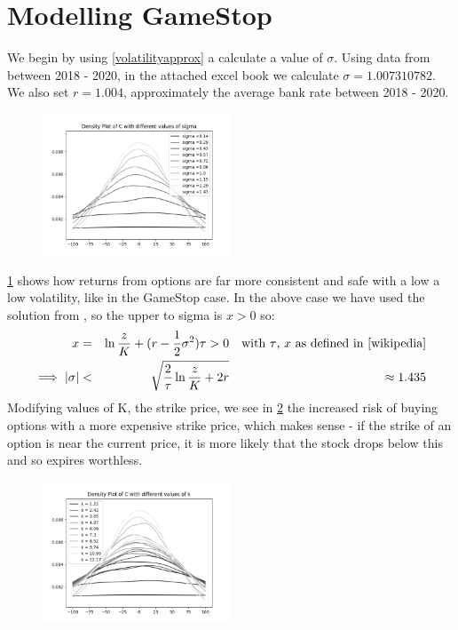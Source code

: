 \documentclass[11pt]{article} %
\begin{document}
\section{Modelling GameStop}
We begin by using \ref{volatilityapprox} a calculate a value of $\sigma$. Using data from 
\cite{nyse} between 2018 - 2020, in the attached excel book we 
calculate $\sigma = 1.007310782$. We also set 
$r=1.004$, approximately the average bank rate between 2018 - 2020.
\begin{figure}[h] 
    \centering
    \includegraphics[width=0.5\textwidth]{sigmavalue.png} 
    \caption[]{}
    \label{sigmavalue}
\end{figure}
\ref{sigmavalue} shows how returns from options are far more consistent and safe with a low a low volatility,
 like in the GameStop case. In the above case we have used the solution from \cite{wikipedia}, 
 so the upper to sigma is $x>0$ so:
\begin{align}
    x =&& \ln{\frac{z}{K}} + (r - \frac{1}{2} \sigma^2)\tau > 0 && 
    \text{with $\tau$, $x$ as defined in \cite{wikipedia}} \\
    \implies |\sigma| <&& \sqrt{\frac{2}{\tau} \ln{\frac{z}{K} + 2r}} && \approx 1.435
\end{align}
Modifying values of K, the strike price, we see in \ref{kvalue} the increased risk 
of buying options with a more expensive strike price, which makes sense - if 
the strike of an option is near the current price, it is more likely that 
the stock drops below this and so expires worthless.
\begin{figure}[h] 
    \centering
    \includegraphics[width=0.5\textwidth]{kvalue.png} 
    \caption[]{}
    \label{kvalue}
\end{figure}
\end{document}
